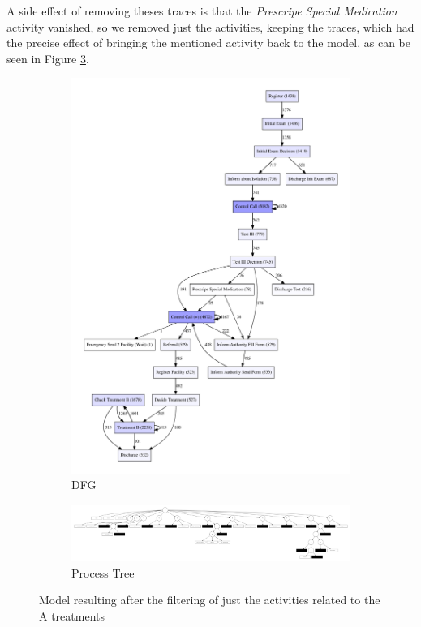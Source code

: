 \documentclass[12pt]{report}
\begin{document}
A side effect of removing theses traces is that the \emph{Prescripe Special Medication} activity vanished, so we removed just the activities, keeping the traces, which had the precise effect of bringing the mentioned activity back to the model, as can be seen in Figure \ref{fig:dfg-pt-silent-A}.

\begin{figure}[h]
    \centering
    \begin{subfigure}[b]{0.2\textwidth}
        \centering
	\includegraphics[width=\textwidth]{figures/q1_d_silent_A.pdf}
        \caption{DFG}
        \label{fig:figures-q1_d_silent_A-pdf}
    \end{subfigure}
    \hfill
    \begin{subfigure}[b]{0.7\textwidth}
        \centering
	\includegraphics[width=\textwidth]{figures/q1_d_tree_silent_A.pdf}
        \caption{Process Tree}
        \label{fig:figures-q1_d_tree_silent_A-pdf}
    \end{subfigure}
    \hfill
    \caption{Model resulting after the filtering of just the activities related to the A treatments}
    \label{fig:dfg-pt-silent-A}
\end{figure}
\end{document}
